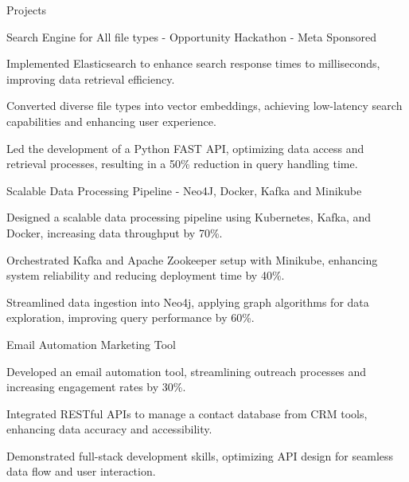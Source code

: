 \documentclass{resume} %
\begin{document}
    \begin{rSection}{Projects}
                    \begin{rSubsection}
                                    {Search Engine for All file types {-} Opportunity Hackathon {-} Meta Sponsored}
                                {\normalfont{ - }}{}{}
                                    \item Implemented Elasticsearch to enhance search response times to milliseconds, improving data retrieval efficiency.
                                    \item Converted diverse file types into vector embeddings, achieving low{-}latency search capabilities and enhancing user experience.
                                    \item Led the development of a Python FAST API, optimizing data access and retrieval processes, resulting in a 50\% reduction in query handling time.
                            \end{rSubsection}
                    \begin{rSubsection}
                                    {Scalable Data Processing Pipeline {-} Neo4J, Docker, Kafka and Minikube}
                                {\normalfont{ - }}{}{}
                                    \item Designed a scalable data processing pipeline using Kubernetes, Kafka, and Docker, increasing data throughput by 70\%.
                                    \item Orchestrated Kafka and Apache Zookeeper setup with Minikube, enhancing system reliability and reducing deployment time by 40\%.
                                    \item Streamlined data ingestion into Neo4j, applying graph algorithms for data exploration, improving query performance by 60\%.
                            \end{rSubsection}
                    \begin{rSubsection}
                                    {Email Automation Marketing Tool}
                                {\normalfont{ - }}{}{}
                                    \item Developed an email automation tool, streamlining outreach processes and increasing engagement rates by 30\%.
                                    \item Integrated RESTful APIs to manage a contact database from CRM tools, enhancing data accuracy and accessibility.
                                    \item Demonstrated full{-}stack development skills, optimizing API design for seamless data flow and user interaction.
                            \end{rSubsection}
            \end{rSection}
\end{document}
